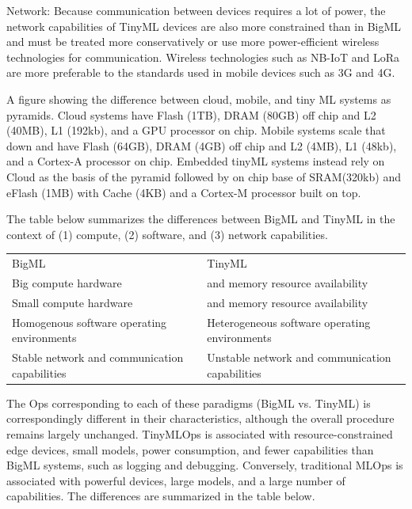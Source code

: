 Network: Because communication between devices requires a lot of power, the network capabilities of TinyML devices are also more constrained than in BigML and must be treated more conservatively or use more power-efficient wireless technologies for communication. Wireless technologies such as NB-IoT and LoRa are more preferable to the standards used in mobile devices such as 3G and 4G.


A figure showing the difference between cloud, mobile, and tiny ML systems as pyramids. Cloud systems have Flash (1TB), DRAM (80GB) off chip and L2 (40MB), L1 (192kb), and a GPU processor on chip. Mobile systems scale that down and have Flash (64GB), DRAM (4GB) off chip and L2 (4MB), L1 (48kb), and a Cortex-A processor on chip. Embedded tinyML systems instead rely on Cloud as the basis of the pyramid followed by on chip base of SRAM(320kb) and eFlash (1MB) with Cache (4KB) and a Cortex-M processor built on top.

The table below summarizes the differences between BigML and TinyML in the context of (1) compute, (2) software, and (3) network capabilities.

\begin{tabular}{ll}
    BigML & TinyML \\
    Big compute hardware & and memory resource availability \\
    Small compute hardware  & and memory resource availability \\
    Homogenous software operating environments & Heterogeneous software operating environments \\
    Stable network and communication capabilities & 
    Unstable network and communication capabilities \\
\end{tabular}

The Ops corresponding to each of these paradigms (BigML vs. TinyML) is correspondingly different in their characteristics, although the overall procedure remains largely unchanged. TinyMLOps is associated with resource-constrained edge devices, small models, power consumption, and fewer capabilities than BigML systems, such as logging and debugging. Conversely, traditional MLOps is associated with powerful devices, large models, and a large number of capabilities. The differences are summarized in the table below.

